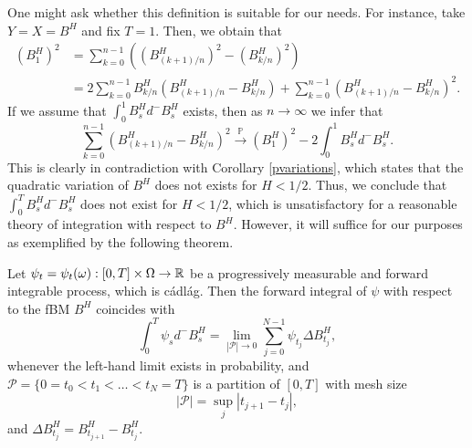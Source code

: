 One might ask whether this definition is suitable for our needs. For instance, take $Y=X=B^{H}$ and fix $T=1$. Then, we obtain that
\begin{align}
    (B_{1}^{H})^{2}&=\sum_{k=0}^{n-1}\left((B_{(k+1)/n}^{H})^{2}-(B_{k/n}^{H})^{2}\right)\\
    &=2\sum_{k=0}^{n-1}B_{k/n}^{H}(B_{(k+1)/n}^{H}-B_{k/n}^{H})+\sum_{k=0}^{n-1}(B_{(k+1)/n}^{H}-B_{k/n}^{H})^{2}.
\end{align}
If we assume that $\int_{0}^{1}B_{s}^{H}d^{-}B_{s}^{H}$ exists, then as $n\to\infty$ we infer that
\begin{equation}
    \sum_{k=0}^{n-1}(B_{(k+1)/n}^{H}-B_{k/n}^{H})^{2}\overset{\mathbb{P}}{\to} (B_{1}^{H})^{2}-2\int_{0}^{1}B_{s}^{H}d^{-}B_{s}^{H}.
\end{equation}
This is clearly in contradiction with Corollary \ref{pvariations}, which states that the quadratic variation of $B^{H}$ does not exists for $H<1/2$. Thus, we conclude that $\int_{0}^{T}B^{H}_{s}d^{-}B^{H}_{s}$ does not exist for $H<1/2$, which is unsatisfactory for a reasonable theory of integration with respect to $B^H$. However, it will suffice for our purposes as exemplified by the following theorem.
\begin{thm}\label{thm:integration}
    Let $\psi_{t}=\psi_{t}(\omega):[0,T]\times \Omega\to \mathbb{R}$ be a progressively measurable and forward integrable process, which is cádlág. Then the forward integral of $\psi$ with respect to the fBM $B^{H}$ coincides with
    \begin{equation}
        \int_{0}^{T}\psi_{s}d^{-}B^{H}_{s}=\lim_{|\mathcal{P}|\to 0}\sum_{j=0}^{N-1}\psi_{t_{j}}\Delta B^{H}_{t_{j}},
    \end{equation}
    whenever the left-hand limit exists in probability, and $\mathcal{P}=\{0=t_{0}<t_{1}<\dots <t_{N}=T\}$ is a partition of $[0,T]$ with mesh size
    \begin{equation}
        |\mathcal{P}|=\sup_{j}|t_{j+1}-t_{j}|,
    \end{equation}
    and $\Delta B^{H}_{t_{j}}=B_{t_{j+1}}^{H}-B_{t_{j}}^{H}$.
\end{thm}

